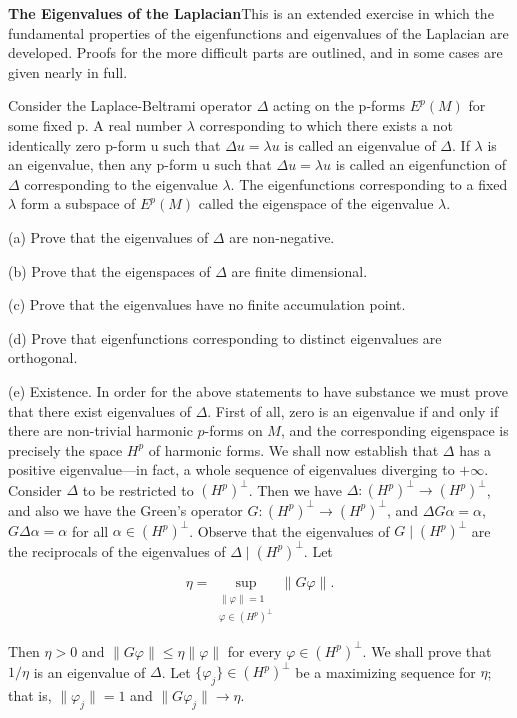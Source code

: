 \begin{problemset}
\item \textbf{The Eigenvalues of the Laplacian}\quad This is an extended exercise in which the fundamental properties of the eigenfunctions and eigenvalues of the Laplacian are developed. Proofs for the more difficult parts are outlined, and in some cases are given nearly in full.

Consider the Laplace-Beltrami operator  $ \Delta $ acting on the p-forms  $ E^{p}(M) $ for some fixed p. A real number  $ \lambda $ corresponding to which there exists a not identically zero p-form u such that  $ \Delta u = \lambda u $ is called an eigenvalue of  $ \Delta $. If  $ \lambda $ is an eigenvalue, then any p-form u such that  $ \Delta u = \lambda u $ is called an eigenfunction of  $ \Delta $ corresponding to the eigenvalue  $ \lambda $. The eigenfunctions corresponding to a fixed  $ \lambda $ form a subspace of  $ E^{p}(M) $ called the eigenspace of the eigenvalue  $ \lambda $. 

(a) Prove that the eigenvalues of  $ \Delta $ are non-negative.

(b) Prove that the eigenspaces of  $ \Delta $ are finite dimensional.

(c) Prove that the eigenvalues have no finite accumulation point.

(d) Prove that eigenfunctions corresponding to distinct eigenvalues are orthogonal.

(e) Existence. In order for the above statements to have substance we must prove that there exist eigenvalues of $\Delta$. First of all, zero is an eigenvalue if and only if there are non-trivial harmonic $p$-forms on $M$, and the corresponding eigenspace is precisely the space $H^p$ of harmonic forms. We shall now establish that $\Delta$ has a positive eigenvalue—in fact, a whole sequence of eigenvalues diverging to $+\infty$. Consider $\Delta$ to be restricted to $(H^p)^\perp$. Then we have $\Delta: (H^p)^\perp \to (H^p)^\perp$, and also we have the Green's operator $G: (H^p)^\perp \to (H^p)^\perp$, and $\Delta G\alpha = \alpha$, $G\Delta\alpha = \alpha$ for all $\alpha \in (H^p)^\perp$. Observe that the eigenvalues of $G \mid (H^p)^\perp$ are the reciprocals of the eigenvalues of $\Delta \mid (H^p)^\perp$. Let

\[
\eta=\sup_{\substack{\|\varphi\|=1\\ \varphi\in(H^{p})^{\perp}}}\|G\varphi\|.
\]

Then $\eta > 0$ and $\|G\varphi\| \leq \eta \|\varphi\|$ for every $\varphi \in (H^{p})^{\perp}$. We shall prove that $1/\eta$ is an eigenvalue of $\Delta$. Let $\{\varphi_j\} \in (H^{p})^{\perp}$ be a maximizing sequence for $\eta$; that is, $\|\varphi_j\| = 1$ and $\|G\varphi_j\| \to \eta$.


\end{problemset}
